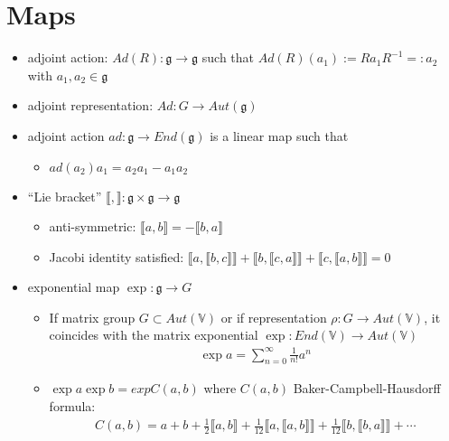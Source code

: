 \documentclass[11pt]{article}
\begin{document}
\section{Maps}
\begin{itemize}
    \item adjoint action: $Ad(R): \mathfrak{g} \to \mathfrak{g}$ such that $Ad(R)(a_1) := Ra_1 R^{-1} =: a_2$ with $a_1, a_2 \in \mathfrak{g}$ 
    \item adjoint representation: $Ad: G \to Aut(\mathfrak{g})$
    \item adjoint action $ad: \mathfrak{g} \to End(\mathfrak{g})$ is a linear map such that 
        \begin{itemize}
            \item $ad(a_2) a_1 = a_2a_1 - a_1a_2$
        \end{itemize}
    \item  ``Lie bracket'' $\llbracket , \rrbracket: \mathfrak{g} \times \mathfrak{g} \to \mathfrak{g}$
        \begin{itemize}
            \item anti-symmetric: $\llbracket a,b \rrbracket = - \llbracket b, a \rrbracket$ 
            \item Jacobi identity satisfied: $\llbracket a, \llbracket b,c \rrbracket \rrbracket + \llbracket b, \llbracket c,a \rrbracket \rrbracket + \llbracket c, \llbracket a,b \rrbracket \rrbracket = 0 $  
        \end{itemize}
        \item exponential map $\exp: \mathfrak{g} \to G$ 
            \begin{itemize}
                \item If matrix group $G \subset Aut(\mathbb{V})$ or if representation $\rho: G \to Aut(\mathbb{V})$, it coincides with the matrix exponential $\exp: End(\mathbb{V}) \to Aut(\mathbb{V})$
                    \begin{align*}
                        \exp a = \sum_{n=0}^\infty \frac{1}{n!} a^n
                    \end{align*}
                \item $\exp a \exp b = exp C(a,b)$ where $C(a,b)$ Baker-Campbell-Hausdorff formula: 
                    \begin{align*}
                        C(a,b) = a + b + \frac{1}{2}\llbracket a, b \rrbracket + \frac{1}{12} \llbracket a, \llbracket a,b \rrbracket \rrbracket + \frac{1}{12}\llbracket b, \llbracket b, a \rrbracket \rrbracket + \cdots 
                    \end{align*}

\end{itemize}
\end{itemize}
\end{document}
